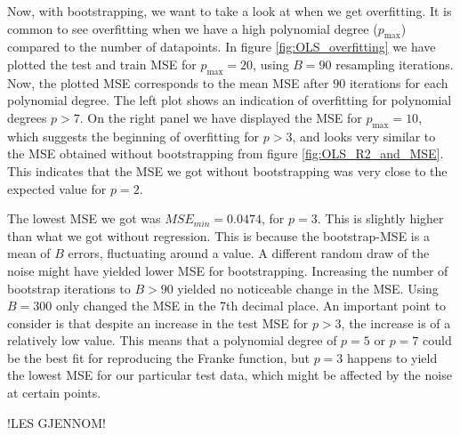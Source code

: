 \documentclass[reprint,english,notitlepage,aps,nobalancelastpage,nofootinbib]{revtex4-1}  %
\begin{document}
Now, with bootstrapping, we want to take a look at when we get overfitting. It is common to see overfitting when we have a high polynomial degree ($p_\text{max}$) compared to the number of datapoints. In figure \ref{fig:OLS_overfitting} we have plotted the test and train MSE for $p_\text{max} = 20$, using $B=90$ resampling iterations. Now, the plotted MSE corresponds to the mean MSE after $90$ iterations for each polynomial degree. The left plot shows an indication of overfitting for polynomial degrees $p > 7$. On the right panel we have displayed the MSE for $p_\text{max} = 10$, which suggests the beginning of overfitting for $p>3$, and looks very similar to the MSE obtained without bootstrapping from figure \ref{fig:OLS_R2_and_MSE}. This indicates that the MSE we got without bootstrapping was very close to the expected value for $p=2$.

The lowest MSE we got was $MSE_{min}=0.0474$, for $p=3$. This is slightly higher than what we got without regression. This is because the bootstrap-MSE is a mean of $B$ errors, fluctuating around a value. A different random draw of the noise might have yielded lower MSE for bootstrapping. Increasing the number of bootstrap iterations to $B>90$ yielded no noticeable change in the MSE. Using $B=300$ only changed the MSE in the 7th decimal place. An important point to consider is that despite an increase in the test MSE for $p>3$, the increase is of a relatively low value. This means that a polynomial degree of $p=5$ or $p=7$ could be the best fit for reproducing the Franke function, but $p=3$ happens to yield the lowest MSE for our particular test data, which might be affected by the noise at certain points.

!LES GJENNOM!
\end{document}

